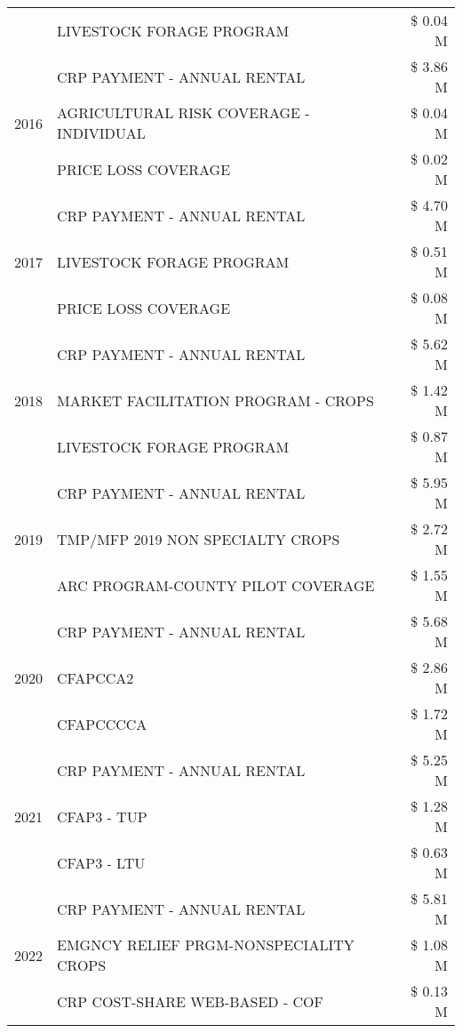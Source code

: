 \begin{tabular}{llr}
 & LIVESTOCK FORAGE PROGRAM & \$ 0.04 M \\
\cline{1-3}
\multirow[t]{3}{*}{2016} & CRP PAYMENT - ANNUAL RENTAL & \$ 3.86 M \\
 & AGRICULTURAL RISK COVERAGE - INDIVIDUAL & \$ 0.04 M \\
 & PRICE LOSS COVERAGE & \$ 0.02 M \\
\cline{1-3}
\multirow[t]{3}{*}{2017} & CRP PAYMENT - ANNUAL RENTAL & \$ 4.70 M \\
 & LIVESTOCK FORAGE PROGRAM & \$ 0.51 M \\
 & PRICE LOSS COVERAGE & \$ 0.08 M \\
\cline{1-3}
\multirow[t]{3}{*}{2018} & CRP PAYMENT - ANNUAL RENTAL & \$ 5.62 M \\
 & MARKET FACILITATION PROGRAM - CROPS & \$ 1.42 M \\
 & LIVESTOCK FORAGE PROGRAM & \$ 0.87 M \\
\cline{1-3}
\multirow[t]{3}{*}{2019} & CRP PAYMENT - ANNUAL RENTAL & \$ 5.95 M \\
 & TMP/MFP 2019 NON SPECIALTY CROPS & \$ 2.72 M \\
 & ARC PROGRAM-COUNTY PILOT COVERAGE & \$ 1.55 M \\
\cline{1-3}
\multirow[t]{3}{*}{2020} & CRP PAYMENT - ANNUAL RENTAL & \$ 5.68 M \\
 & CFAPCCA2 & \$ 2.86 M \\
 & CFAPCCCCA & \$ 1.72 M \\
\cline{1-3}
\multirow[t]{3}{*}{2021} & CRP PAYMENT - ANNUAL RENTAL & \$ 5.25 M \\
 & CFAP3 - TUP & \$ 1.28 M \\
 & CFAP3 - LTU & \$ 0.63 M \\
\cline{1-3}
\multirow[t]{3}{*}{2022} & CRP PAYMENT - ANNUAL RENTAL & \$ 5.81 M \\
 & EMGNCY RELIEF PRGM-NONSPECIALITY CROPS & \$ 1.08 M \\
 & CRP COST-SHARE WEB-BASED - COF & \$ 0.13 M \\
\cline{1-3}
\bottomrule
\end{tabular}
